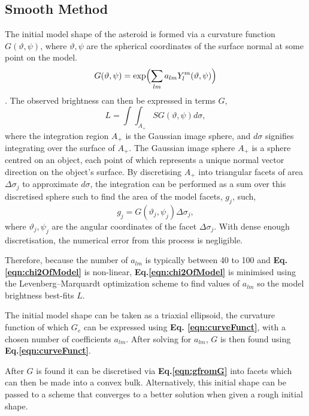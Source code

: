 \documentclass[10pt,twocolumn]{revtex4}    %
\newcommand{\refeq}[1]{\textbf{Eq.#1}}
\begin{document}
\subsection{Smooth Method}\label{ssec:smoothMethod}

The initial model shape of the asteroid is formed via a curvature function $G(\vartheta, \psi)$, where $\vartheta, \psi$ are the spherical coordinates of the surface normal at some point on the model.
\begin{equation}\label{eqn:curveFunct}
    G(\vartheta, \psi) = \exp \Bigl(\sum\limits_{lm} a_{lm} Y^m_l(\vartheta, \psi)\Bigl) 
\end{equation}.
The observed brightness can then be expressed in terms $G$,
\begin{equation}\label{eqn:brightnessandG}
    L = \int \int_{A_+} SG(\vartheta, \psi) d\sigma,
\end{equation}
where the integration region $A_+$ is the Gaussian image sphere, and $d\sigma$ signifies integrating over the surface of $A_+$. The Gaussian image sphere $A_+$ is a sphere centred on an object, each point of which represents a unique normal vector direction on the object's surface.
By discretising $A_+$ into triangular facets of area $\Delta \sigma_j$ to approximate $d\sigma$, the integration can be performed as a sum over this discretised sphere such to find the area of the model facets, $g_j$, such,
\begin{equation}
    \label{eqn:gfromG}
    g_j = G(\vartheta_j, \psi_j) \Delta \sigma_j,
\end{equation}
where $\vartheta_j, \psi_j$ are the angular coordinates of the facet $\Delta \sigma_j$. With dense enough discretisation, the numerical error from this process is negligible.

Therefore, because the number of $a_{lm}$ is typically between 40 to 100 and \refeq{\ref{eqn:chi2OfModel}} is non-linear, \refeq{\ref{eqn:chi2OfModel}} is minimised using the Levenberg–Marquardt optimization scheme to find values of $a_{lm}$ so the model brightness best-fits $L$.

The initial model shape can be taken as a triaxial ellipsoid, the curvature function of which $G_e$ can be expressed using \textbf{Eq. \ref{eqn:curveFunct}}, with a chosen number of coefficients $a_{lm}$. After solving for $a_{lm}$, $G$ is then found using \refeq{\ref{eqn:curveFunct}}.

After $G$ is found it can be discretised via \refeq{\ref{eqn:gfromG}} into facets which can then be made into a convex bulk. Alternatively, this initial shape can be passed to a scheme that converges to a better solution when given a rough initial shape. 
\end{document}
